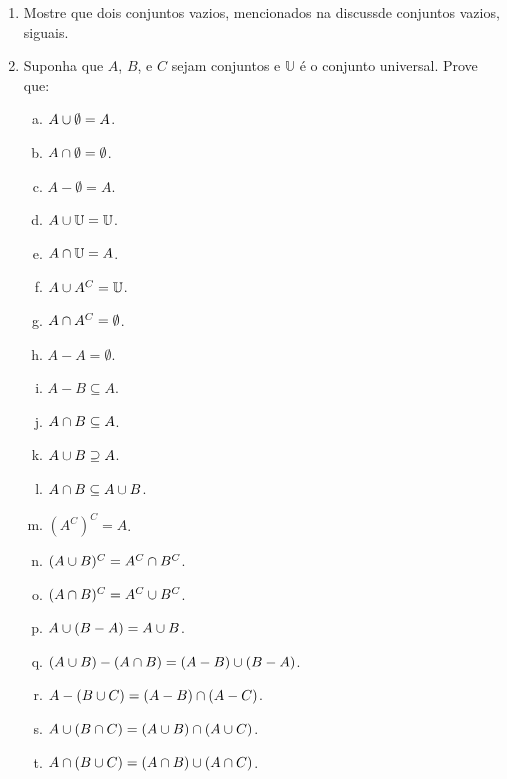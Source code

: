 \begin{enumerate}[{\bf 1.}]
\item Mostre que dois conjuntos vazios, mencionados na discuss\ao de conjuntos vazios, s\ao iguais.

\item \label{conjuntos5}Suponha que $A$, $B$, e $C$ sejam conjuntos e $\mathbb{U}$ \'e o conjunto universal. Prove que:
\begin{enumerate}[a)]
\item $A\cup\emptyset=A$.
\item $A\cap\emptyset=\emptyset$.
\item $A-\emptyset=A$.
\item $A\cup\mathbb{U}=\mathbb{U}$.
\item $A\cap\mathbb{U}=A$.
\item $A\cup A^C=\mathbb{U}$.
\item $A\cap A^C=\emptyset$.
\item $A-A=\emptyset$.
\item $A-B\subseteq A$.
\item $A\cap B \subseteq A$.
\item $A\cup B \supseteq A$.
\item $A\cap B\subseteq A\cup B$.
\item $(A^C)^C=A$.
\item $(A\cup B)^C = A^C\cap B^C$.
\item $(A\cap B)^C = A^C\cup B^C$.
\item $A\cup(B-A)=A\cup B$.
\item $(A\cup B)-(A\cap B)=(A-B)\cup(B-A)$.
\item $A-(B\cup C)=(A-B)\cap(A-C)$.
\item $A\cup(B\cap C)=(A\cup B)\cap(A\cup C)$.
\item $A\cap(B\cup C)=(A\cap B)\cup(A\cap C)$.
\end{enumerate}


\end{enumerate}
